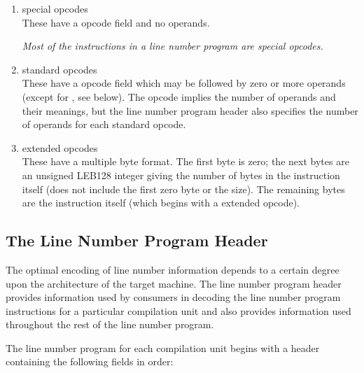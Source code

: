 \begin{enumerate}[1. ]
\item special opcodes \\
These have a  opcode field and no operands.\vspace{1ex}

\textit{Most of the instructions in a 
line number program are special opcodes.}

\item standard opcodes \\
These have a  opcode field which may be followed by zero or more
 operands (except for 
\mbox{\DWLNSfixedadvancepc,} see below).
The opcode implies the number of operands and their meanings, but the
line number program header also specifies the number of operands for
each standard opcode.

\item extended opcodes \\
These have a multiple byte format. The first byte is zero; the next bytes
are an unsigned LEB128 integer giving the number of bytes in the
instruction itself (does not include the first zero byte or the size). The
remaining bytes are the instruction itself (which begins with a 
extended opcode). \\
\end{enumerate}


\subsection{The Line Number Program Header}

The optimal encoding of line number information depends to a
certain degree upon the architecture of the target machine. The
line number program header provides information used by
consumers in decoding the line number program instructions for
a particular compilation unit and also provides information
used throughout the rest of the line number program.

The line number program for each compilation unit begins with
a header containing the following fields in order:


